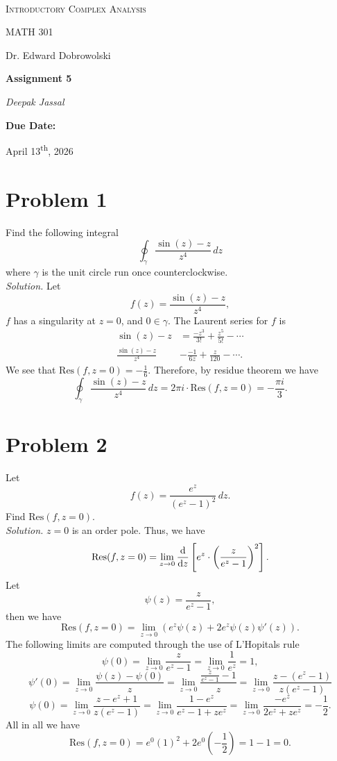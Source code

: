 \documentclass[12pt]{article}
\renewcommand{\author}{Deepak Jassal}
\renewcommand{\coursename}{Introductory Complex Analysis}
\renewcommand{\coursecode}{MATH 301}
\renewcommand{\assignment}{Assignment 5}
\renewcommand{\instructor}{Dr. Edward Dobrowolski}
\renewcommand{\duedate}{April 13\textsuperscript{th}, 2026}
\begin{document}
\begin{titlepage}
	\centering
	\vspace*{2.0cm}	
	\\
	{\LARGE \textsc{\coursename}\par}
	\vspace{0.5cm}
	{\large\coursecode\par}
    \vspace{0.5cm}
    {\large\instructor\par}
	\vspace{1.5cm}
	{\huge\bfseries\assignment\par}
	\vspace{1cm}  
	{\LARGE\itshape\author\par}
    \vspace{2cm}
	{\large\bfseries Due Date:\par}
	\vspace{0.5cm}
	{\Large \duedate}\\
\end{titlepage}
\section*{Problem 1}
Find the following integral
\[
    \oint_\gamma\frac{\sin(z)-z}{z^4}\,dz 
\]
where $\gamma$ is the unit circle run once counterclockwise.\\
\textit{Solution.} Let 
\[
    f(z)=\frac{\sin(z)-z}{z^4},
\]
$f$ has a singularity at $z=0$, and $0\in\gamma$. The Laurent series for $f$ is
\begin{align*}
    \sin(z)-z&=\frac{-z^3}{3!}+\frac{z^5}{5!}-\cdots\\
    \frac{\sin(z)-z}{z^4}&-\frac{-1}{6z}+\frac{z}{120}-\cdots.
\end{align*}
We see that $\mathrm{Res}(f,z=0)=-\frac{1}{6}$. Therefore, by residue theorem we have
\[
    \oint_\gamma\frac{\sin(z)-z}{z^4}\,dz=2\pi i\cdot\mathrm{Res}(f,z=0)=-\frac{\pi i}{3}. 
\]
\section*{Problem 2}
Let 
\[
    f(z)=\frac{e^z}{(e^z-1)^2}\,dz.
\]
Find $\mathrm{Res}(f,z=0)$.\\
\textit{Solution.} $z=0$ is an order pole. Thus, we have
\[
    \mathrm{Res}(f,z=0)=\lim_{z\to0}\frac{\mathrm{d}}{\mathrm{d}z}\left[e^z\cdot\left(\frac{z}{e^z-1}\right)^2\right].
\]
Let 
\[
    \psi(z)=\frac{z}{e^z-1},
\]
then we have
\[
    \mathrm{Res}(f,z=0)=\lim_{z\to0}(e^z\psi(z)+2e^z\psi(z)\psi'(z)).
\]
The following limits are computed through the use of L'Hopitals rule
\[
    \psi(0)=\lim_{z\to0}\frac{z}{e^z-1}=\lim_{z\to0}\frac{1}{e^z}=1,
\]
\[
    \psi'(0)=\lim_{z\to0}\frac{\psi(z)-\psi(0)}{z}=\lim_{z\to0}\frac{\frac{z}{e^z-1}-1}{z}=\lim_{z\to0}\frac{z-(e^z-1)}{z(e^z-1)}
\]
\[
    \psi(0)=\lim_{z\to0}\frac{z-e^z+1}{z(e^z-1)}=\lim_{z\to0}\frac{1-e^z}{e^z-1+ze^z}=\lim_{z\to0}\frac{-e^z}{2e^z+ze^z}=-\frac{1}{2}.
\]
All in all we have
\[
    \mathrm{Res}(f,z=0)=e^0(1)^2+2e^0\left(-\frac{1}{2}\right)=1-1=0.
\]
\end{document}
